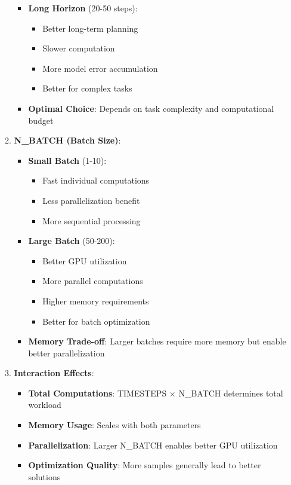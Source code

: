 \begin{itemize}
\begin{enumerate}
\begin{itemize}
            \item \textbf{Long Horizon} (20-50 steps):
            \begin{itemize}
                \item Better long-term planning
                \item Slower computation
                \item More model error accumulation
                \item Better for complex tasks
            \end{itemize}
            
            \item \textbf{Optimal Choice}: Depends on task complexity and computational budget
        \end{itemize}
        
        \item \textbf{N\_BATCH (Batch Size)}:
        \begin{itemize}
            \item \textbf{Small Batch} (1-10):
            \begin{itemize}
                \item Fast individual computations
                \item Less parallelization benefit
                \item More sequential processing
            \end{itemize}
            
            \item \textbf{Large Batch} (50-200):
            \begin{itemize}
                \item Better GPU utilization
                \item More parallel computations
                \item Higher memory requirements
                \item Better for batch optimization
            \end{itemize}
            
            \item \textbf{Memory Trade-off}: Larger batches require more memory but enable better parallelization
        \end{itemize}
        
        \item \textbf{Interaction Effects}:
        \begin{itemize}
            \item \textbf{Total Computations}: TIMESTEPS × N\_BATCH determines total workload
            \item \textbf{Memory Usage}: Scales with both parameters
            \item \textbf{Parallelization}: Larger N\_BATCH enables better GPU utilization
            \item \textbf{Optimization Quality}: More samples generally lead to better solutions
        \end{itemize}
        

\end{enumerate}
\end{itemize}
